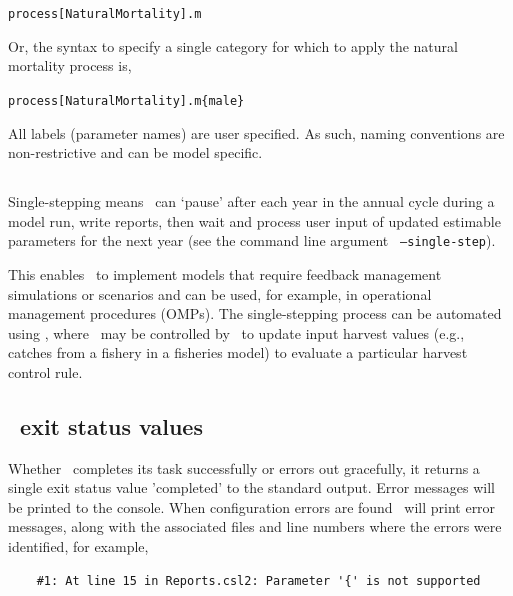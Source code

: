 \texttt{process[NaturalMortality].m}

Or, the syntax to specify a single category for which to apply the natural mortality process is,

\texttt{process[NaturalMortality].m\{male\}}

All labels (parameter names) are user specified. As such, naming conventions are non-restrictive and can be model specific.

\subsection{\label{sec:singlestepping}}

Single-stepping means \CNAME\ can `pause' after each year in the annual cycle during a model run, write reports, then wait and process user input of updated estimable parameters for the next year (see the command line argument \texttt{ --single-step}). 

This enables \CNAME\ to implement models that require feedback management simulations or scenarios and can be used, for example, in operational management procedures (OMPs). The single-stepping process can be automated using \R, where \CNAME\ may be controlled by \R\ to update input harvest values (e.g., catches from a fishery in a fisheries model) to evaluate a particular harvest control rule. 

\subsection{\CNAME\ exit status values}
Whether \CNAME\ completes its task successfully or errors out gracefully, it returns a single exit status value 'completed' to the standard output. Error messages will be printed to the console. When configuration errors are found \CNAME\ will print error messages, along with the associated files and line numbers where the errors were identified, for example,

{\small{\begin{verbatim}
	#1: At line 15 in Reports.csl2: Parameter '{' is not supported
\end{verbatim}}}
